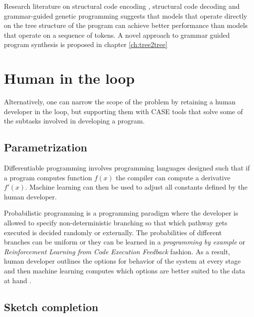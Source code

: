 Research literature on structural code encoding \cite{alonStructuralLanguageModels2019,zhangTreeRecurrentNeural2015}, structural code decoding \cite{jiangASTStructureEnhanced2021,sunGrammarbasedStructuralCNN2019} and grammar-guided genetic programming \cite{bunelLeveragingGrammarReinforcement2018,manriqueGrammarguidedGeneticProgramming2009,sobaniaChallengesProgramSynthesis2020} suggests that models that operate directly on the tree structure of the program can achieve better performance than models that operate on a sequence of tokens.
A novel approach to grammar guided program synthesis is proposed in chapter \ref{ch:tree2tree}

\newpage
\section{Human in the loop}
\label{sec:human}

Alternatively, one can narrow the scope of the problem by retaining a human developer in the loop, but supporting them with CASE \cite{caseComputeraidedSoftwareEngineering1985} tools that solve some of the subtasks involved in developing a program.

\subsection{Parametrization}

Differentiable programming \cite{blondelElementsDifferentiableProgramming2024} involves programming languages designed such that if a program computes function $f(x)$ the compiler can compute a derivative $f'(x)$. 
Machine learning can then be used to adjust all constants defined by the human developer.

Probabilistic programming \cite{gordonProbabilisticProgramming2014} is a programming paradigm where the developer is allowed to specify non-deterministic branching so that which pathway gets executed is decided randomly or externally.
The probabilities of different branches can be uniform or they can be learned in a \emph{programming by example} or \emph{Reinforcement Learning from Code Execution Feedback} fashion.
As a result, human developer outlines the options for behavior of the system at every stage and then machine learning computes which options are better suited to the data at hand \cite{gauntTerpreTProbabilisticProgramming2016}.

\subsection{Sketch completion}
\label{sec:sketching}

